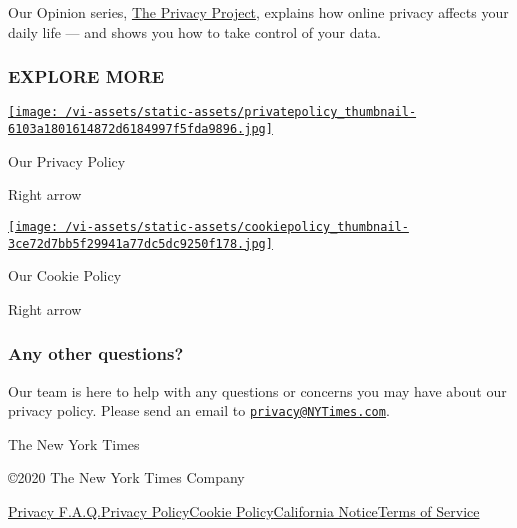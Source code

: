 Our Opinion series,
\href{https://www.nytimes3xbfgragh.onion/series/new-york-times-privacy-project}{The
Privacy Project}, explains how online privacy affects your daily life
--- and shows you how to take control of your data.

\hypertarget{explore-more}{%
\subsubsection{EXPLORE MORE}\label{explore-more}}

\href{/privacy/privacy-policy}{\texttt{[image: /vi-assets/static-assets/privatepolicy\_thumbnail-6103a1801614872d6184997f5fda9896.jpg]}}

Our Privacy Policy

Right arrow

\href{/privacy/cookie-policy}{\texttt{[image: /vi-assets/static-assets/cookiepolicy\_thumbnail-3ce72d7bb5f29941a77dc5dc9250f178.jpg]}}

Our Cookie Policy

Right arrow

\hypertarget{any-other-questions}{%
\subsubsection{Any other questions?}\label{any-other-questions}}

Our team is here to help with any questions or concerns you may have
about our privacy policy. Please send an email to
\href{mailto:privacy@NYTimes.com}{\nolinkurl{privacy@NYTimes.com}}.

The New York Times

©2020 The New York Times Company

\href{/privacy}{Privacy F.A.Q.}\href{/privacy/privacy-policy}{Privacy
Policy}\href{/privacy/cookie-policy}{Cookie
Policy}\href{/privacy/california-notice}{California
Notice}\href{https://help.nytimes3xbfgragh.onion/hc/en-us/articles/115014893428-Terms-of-service}{Terms
of Service}
